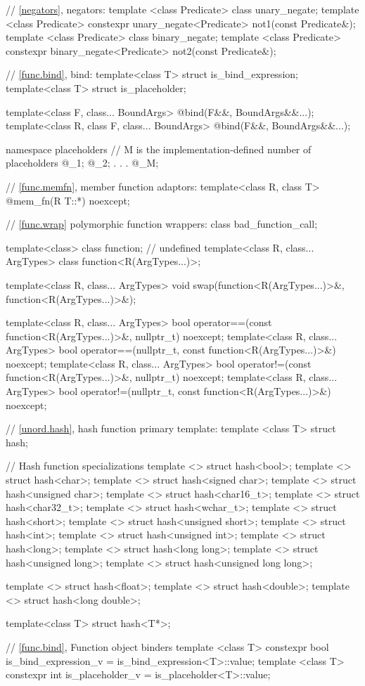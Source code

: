 \begin{codeblock}
{  // \ref{negators}, negators:
  template <class Predicate> class unary_negate;
  template <class Predicate>
    constexpr unary_negate<Predicate> not1(const Predicate&);
  template <class Predicate> class binary_negate;
  template <class Predicate>
    constexpr binary_negate<Predicate> not2(const Predicate&);

  // \ref{func.bind}, bind:
  template<class T> struct is_bind_expression;
  template<class T> struct is_placeholder;

  template<class F, class... BoundArgs>
    @\unspec@ bind(F&&, BoundArgs&&...);
  template<class R, class F, class... BoundArgs>
    @\unspec@ bind(F&&, BoundArgs&&...);

  namespace placeholders {
    // M is the implementation-defined number of placeholders
    @\seebelow@ _1;
    @\seebelow@ _2;
                .
                .
                .
    @\seebelow@ _M;
  }

  // \ref{func.memfn}, member function adaptors:
  template<class R, class T> @\unspec@ mem_fn(R T::*) noexcept;

  // \ref{func.wrap} polymorphic function wrappers:
  class bad_function_call;

  template<class> class function; // undefined
  template<class R, class... ArgTypes> class function<R(ArgTypes...)>;

  template<class R, class... ArgTypes>
    void swap(function<R(ArgTypes...)>&, function<R(ArgTypes...)>&);

  template<class R, class... ArgTypes>
    bool operator==(const function<R(ArgTypes...)>&, nullptr_t) noexcept;
  template<class R, class... ArgTypes>
    bool operator==(nullptr_t, const function<R(ArgTypes...)>&) noexcept;
  template<class R, class... ArgTypes>
    bool operator!=(const function<R(ArgTypes...)>&, nullptr_t) noexcept;
  template<class R, class... ArgTypes>
    bool operator!=(nullptr_t, const function<R(ArgTypes...)>&) noexcept;

  // \ref{unord.hash}, hash function primary template:
  template <class T> struct hash;

  // Hash function specializations
  template <> struct hash<bool>;
  template <> struct hash<char>;
  template <> struct hash<signed char>;
  template <> struct hash<unsigned char>;
  template <> struct hash<char16_t>;
  template <> struct hash<char32_t>;
  template <> struct hash<wchar_t>;
  template <> struct hash<short>;
  template <> struct hash<unsigned short>;
  template <> struct hash<int>;
  template <> struct hash<unsigned int>;
  template <> struct hash<long>;
  template <> struct hash<long long>;
  template <> struct hash<unsigned long>;
  template <> struct hash<unsigned long long>;

  template <> struct hash<float>;
  template <> struct hash<double>;
  template <> struct hash<long double>;

  template<class T> struct hash<T*>;

  // \ref{func.bind}, Function object binders
  template <class T> constexpr bool is_bind_expression_v
    = is_bind_expression<T>::value;
  template <class T> constexpr int is_placeholder_v
    = is_placeholder<T>::value;
}
\end{codeblock}

